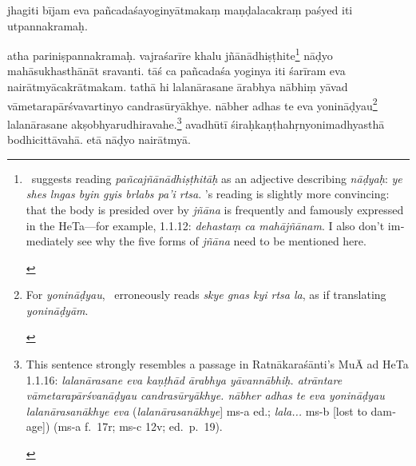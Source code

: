 \documentclass[naipra.tex]{subfiles}
\begin{document}
\begin{sanskrit}
\pstart
jhagiti bījam  eva pañcadaśayoginyātmakaṃ maṇḍalacakraṃ paśyed iti utpannakramaḥ. 
\pend



\pstart
atha pariniṣpannakramaḥ.
vajraśarīre khalu jñānādhiṣṭhite\footnote{\begin{english}
	\TIB\ suggests reading \emph{pañcajñānādhiṣṭhitāḥ} as an adjective describing \emph{nāḍyaḥ}: \emph{ye shes lngas byin gyis brlabs pa'i rtsa}. 
	\MSN 's reading is slightly more convincing: that the body is presided over by \emph{jñāna} is frequently and famously expressed in the HeTa—for example, 1.1.12: \emph{dehastaṃ ca mahājñānam}.
	I also don't immediately see why the five forms of \emph{jñāna} need to be mentioned here.
\end{english}}  nāḍyo mahāsukhasthānāt sravanti.
tāś ca pañcadaśa yoginya iti śarīram eva nairātmyācakrātmakam. 
tathā hi lalanārasane  ārabhya nābhiṃ yāvad vāmetarapārśvavartinyo candrasūryākhye.
nābher adhas te eva yonināḍyau\footnote{\begin{english}
	For \emph{yonināḍyau}, \TIB\ erroneously reads \emph{skye gnas kyi rtsa la}, as if translating \emph{yonināḍyām}.
\end{english}} lalanārasane akṣobhyarudhiravahe.\footnote{\begin{english}
	This sentence strongly resembles a passage in Ratnākaraśānti's MuĀ ad HeTa 1.1.16:
	\emph{lalanārasane eva kaṇṭhād ārabhya yāvannābhiḥ.
	atrāntare vāmetarapārśvanāḍyau candrasūryākhye.
	nābher adhas te eva yonināḍyau lalanārasanākhye eva} (\emph{lalanārasanākhye}] ms-a ed.; \emph{lala...} ms-b [lost to damage]) (ms-a f.\ 17r; ms-c 12v; ed.\ p.\ 19).
\end{english}}
avadhūtī śiraḥkaṇṭhahṛnyonimadhyasthā bodhicittāvahā.
etā nāḍyo nairātmyā. 
\pend




\end{sanskrit}
\end{document}
